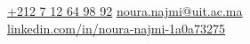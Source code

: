 \documentclass[darkxp]{../../lib/physics}
\newlength{\rightcolwidth}
\begin{document}
\begin{paracol}{2}
\vfill{} %

\setlength{\parindent}{0pt}
\begin{minipage}[t]{\rightcolwidth}
\begin{center}\fontfamily{\sfdefault}\selectfont \color{black!70}
{\href{callto:+212712649892}{ \textcolor{black!70}{+212 7 12 64 98 92}}
{\href{mailto:noura.najmi@uit.ac.ma}{ \textcolor{black!70}{noura.najmi@uit.ac.ma}}\\
\href{https://www.linkedin.com/in/noura-najmi-1a0a73275/}{ \textcolor{black!70}{linkedin.com/in/noura-najmi-1a0a73275}} 
}


}
\end{center}\vspace{-0.5em} %
\end{minipage}


\end{paracol}
\end{document}
